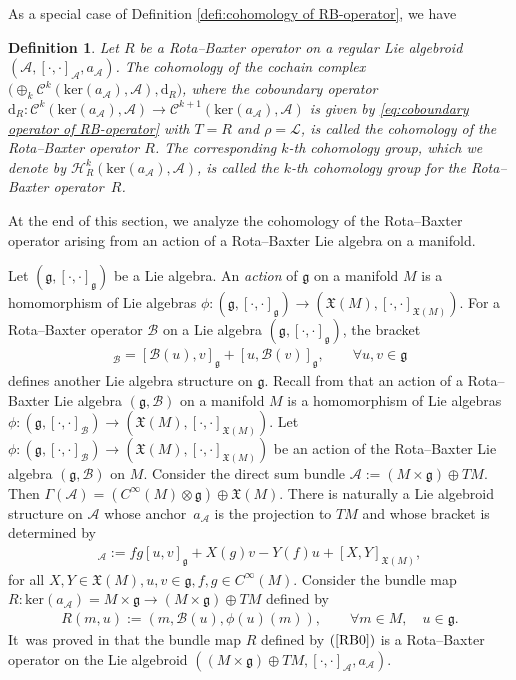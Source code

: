 \documentclass[10pt,a4paper]{amsart}
\numberwithin{equation}{section}
\newtheorem{defi}[thm]{Definition}
\newcommand{\g}{\mathfrak g}
\newcommand{\huaA}{\mathcal{A}}
\newcommand{\huaB}{\mathcal{B}}
\newcommand{\huaC}{\mathcal{C}}
\newcommand{\huaL}{\mathcal{L}}
\newcommand{\huaH}{\mathcal{H}}
\newcommand{\frkX}{\mathfrak X}
\newcommand{\frkg}{\mathfrak g}
\newcommand{\CWM}{C^{\infty}(M)}
\newcommand{\dM}{\mathrm{d}}
\newcommand{\Ker}{\mathrm{ker}}
\begin{document}
As a special case of Definition \ref{defi:cohomology of RB-operator}, we have
\begin{defi}%
 Let $R$ be a Rota--Baxter operator on a regular Lie algebroid $(\huaA,[\cdot,\cdot]_\huaA,a_\huaA)$. The cohomology of the cochain complex $\big({\oplus}_k\huaC^k(\Ker(a_\huaA),\huaA),\dM_R\big)$, where the coboundary operator $\dM_R\colon \huaC^k(\Ker(a_\huaA),\huaA)\to\huaC^{k+1}(\Ker(a_\huaA),\huaA)$ is given by \eqref{eq:coboundary operator of RB-operator} with $T=R$ and $\rho=\huaL$, is called the {\it cohomology of the Rota--Baxter operator} $R$. The corresponding $k$-th cohomology group, which we denote by $\huaH_{R}^k(\Ker(a_\huaA),\huaA)$, is called the {\it $k$-th cohomology group} for the Rota--Baxter operator~$R$.
\end{defi}

At the end of this section, we analyze the cohomology of the Rota--Baxter operator arising from an action of a Rota--Baxter Lie algebra on a manifold.

Let $(\frkg,[\cdot,\cdot]_{\frkg})$ be a Lie algebra. An {\it action}
of $\frkg$ on a manifold $M$ is a homomorphism
of Lie algebras $\phi \colon (\g, [\cdot,\cdot]_\g)\to(\mathfrak{X}(M),[\cdot,\cdot]_{\frkX(M)})$. For a Rota--Baxter operator $\huaB$ on a Lie algebra $(\g,[\cdot,\cdot]_\g)$, the bracket
{\sloppy\begin{gather*}%
 [u,v]_\huaB=[\huaB(u),v]_\g+[u,\huaB(v)]_\g, \qquad \forall u,v\in\g
\end{gather*}
defines another Lie algebra structure on $\g$. Recall from \cite{Rota--Baxter_Lie_algebroid} that an action of a Rota--Baxter Lie algebra $(\g,\huaB)$
 on a manifold $M$ is a homomorphism
of Lie algebras $\phi \colon (\g, [\cdot,\cdot]_\huaB)\to(\mathfrak{X}(M),[\cdot,\cdot]_{\frkX(M)})$.
Let $\phi \colon (\g, [\cdot,\cdot]_\huaB)\to(\mathfrak{X}(M),[\cdot,\cdot]_{\frkX(M)})$ be an action of the Rota--Baxter Lie algebra $(\g,\huaB)$ on $M$. Consider the direct sum bundle $\huaA := (M \times\g)\oplus TM$. Then $\Gamma(\huaA) = (\CWM\otimes\g)\oplus\mathfrak{X}(M)$. There is naturally a Lie algebroid structure on $\huaA$ whose anchor~$a_{\huaA}$ is the projection to $TM$
and whose bracket is determined by
\begin{gather*}%
[fu+X,gv+Y]_{\huaA} := fg[u, v]_\g+X(g)v-Y(f)u+[X,Y]_{{\frkX(M)}},
\end{gather*}}\noindent
for all $X,Y\in\mathfrak{X}(M), u,v\in\g, f,g\in\CWM$. Consider the bundle map $R\colon \Ker(a_\huaA)=M\times\g\to (M\times\g)\oplus TM$ defined by
\begin{gather}\label{RB0}
 R(m,u):=(m,\huaB(u),\phi(u)(m)),\qquad \forall m\in M,\quad u\in\g.
\end{gather}
It~was proved in \cite{Rota--Baxter_Lie_algebroid}
 that the bundle map $R$ defined by $(\ref{RB0})$ is a Rota--Baxter operator on the Lie algebroid $((M \times\g)\oplus TM,[\cdot,\cdot]_{\huaA},a_{\huaA})$.
\end{document}
